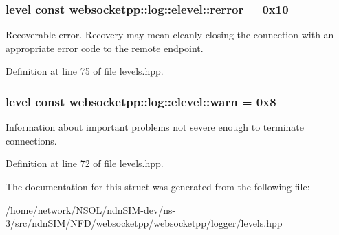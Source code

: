 \subsubsection[{\texorpdfstring{rerror}{rerror}}]{\setlength{\rightskip}{0pt plus 5cm}level const websocketpp\+::log\+::elevel\+::rerror = 0x10\hspace{0.3cm}{\ttfamily [static]}}\hypertarget{structwebsocketpp_1_1log_1_1elevel_ae8a9a9f8b1fa45a731acd340e10aa342}{}\label{structwebsocketpp_1_1log_1_1elevel_ae8a9a9f8b1fa45a731acd340e10aa342}
Recoverable error. Recovery may mean cleanly closing the connection with an appropriate error code to the remote endpoint. 

Definition at line 75 of file levels.\+hpp.

\subsubsection[{\texorpdfstring{warn}{warn}}]{\setlength{\rightskip}{0pt plus 5cm}level const websocketpp\+::log\+::elevel\+::warn = 0x8\hspace{0.3cm}{\ttfamily [static]}}\hypertarget{structwebsocketpp_1_1log_1_1elevel_aef51fd791400121297f38f4381edaebe}{}\label{structwebsocketpp_1_1log_1_1elevel_aef51fd791400121297f38f4381edaebe}
Information about important problems not severe enough to terminate connections. 

Definition at line 72 of file levels.\+hpp.



The documentation for this struct was generated from the following file\+:\begin{DoxyCompactItemize}
\item 
/home/network/\+N\+S\+O\+L/ndn\+S\+I\+M-\/dev/ns-\/3/src/ndn\+S\+I\+M/\+N\+F\+D/websocketpp/websocketpp/logger/levels.\+hpp\end{DoxyCompactItemize}
